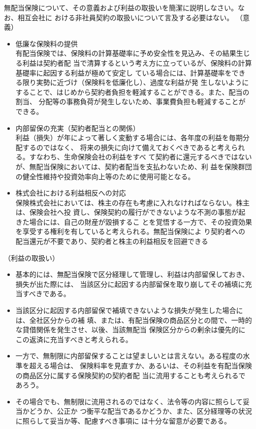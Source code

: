 \documentclass[report,gutter=10mm,fore-edge=10mm,uplatex,dvipdfmx]{jlreq}
\begin{document}
無配当保険について、その意義および利益の取扱いを簡潔に説明しなさい。なお、相互会社に
おける非社員契約の取扱いについて言及する必要はない。
（意義）
\begin{itemize}
\item 低廉な保険料の提供\\
 有配当保険では、保険料の計算基礎率に予め安全性を見込み、その結果生じる利益は契約者配
 当で清算するという考え方に立っているが、保険料の計算基礎率に起因する利益が極めて安定し
 ている場合には、計算基礎率をできる限り実勢に近づけ（保険料を低廉化し）、過度な利益が発
 生しないようにすることで、はじめから契約者負担を軽減することができる。また、配当の割当、
 分配等の事務負荷が発生しないため、事業費負担も軽減することができる。
\item 内部留保の充実（契約者配当との関係）\\
 利益（損失）が年によって著しく変動する場合には、各年度の利益を毎期分配するのではなく、
 将来の損失に向けて備えておくべきであると考えられる。すなわち、生命保険会社の利益をすべ
 て契約者に還元するべきではないが、無配当保険においては、契約者配当を支払わないため、利
 益を保険群団の健全性維持や投資効率向上等のために使用可能となる。
\item 株式会社における利益相反への対応\\
 保険株式会社においては、株主の存在も考慮に入れなければならない。株主は、保険会社へ投
 資し、保険契約の履行ができないような不測の事態が起きた場合には、自己の財産が毀損するこ
 とを覚悟する一方で、その投資効果を享受する権利を有していると考えられる。無配当保険によ
 り契約者への配当還元が不要であり、契約者と株主の利益相反を回避できる
\end{itemize}

（利益の取扱い）
\begin{itemize}
\item 基本的には、無配当保険で区分経理して管理し、利益は内部留保しておき、損失が出た際には、
 当該区分に起因する内部留保を取り崩してその補填に充当すべきである。
\item 当該区分に起因する内部留保で補填できないような損失が発生した場合には、全社区分からの補
 填、または、有配当保険の商品区分との間で、一時的な貸借関係を発生させ、以後、当該無配当
 保険区分からの剰余は優先的にこの返済に充当すべきと考えられる。
\item 一方で、無制限に内部留保することは望ましいとは言えない。ある程度の水準を超える場合は、
 保険料率を見直すか、あるいは、その利益を有配当保険の商品区分に属する保険契約の契約者配
 当に流用することも考えられるであろう。
\item その場合でも、無制限に流用されるのではなく、法令等の内容に照らして妥当かどうか、公正か
 つ衡平な配当であるかどうか、また、区分経理等の状況に照らして妥当か等、配慮すべき事項に
 は十分な留意が必要である。
\end{itemize}
\end{document}
